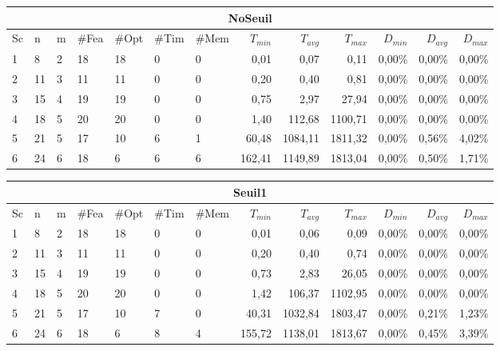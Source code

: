 \documentclass[twoside,fleqn]{EPURapport}
\begin{document}
\begin{table}[h]
    \centering
    \begin{tabular}{|l|l|l|l|l|l|l|r|r|r|r|r|r|}
    	\hline
    	\multicolumn{13}{|c|}{NoSeuil}\\ \hline
Sc &	n	&m	&\#Fea	&\#Opt	&\#Tim &\#Mem	&$T_{min}$ & $T_{avg}$	& $T_{max}$ & $D_{min}$ & $D_{avg}$	& $D_{max}$ \\ \hline
1&	8 &	2&	18&	18&	0&	0&	0,01&	0,07&	0,11	&0,00\%&	0,00\%&	0,00\%    \\ \hline
2&	11&	3&	11&	11&	0&	0&	0,20&	0,40&	0,81	&0,00\%&	0,00\%&	0,00\%     \\ \hline
3&	15&	4&	19&	19&	0&	0&	0,75&	2,97&	27,94	&0,00\%&	0,00\%&	0,00\%  \\ \hline
4 &	18	&5	&20	    &20	    &0	    & 0	        &1,40	&    112,68	&1100,71	&0,00\%&0,00\%&0,00\% \\ \hline
5 &	21	&5	&17	    &10	    &6	    & 1	        &60,48	&1084,11	&1811,32	&0,00\%&0,56\%&4,02\% \\ \hline
6 &	24	&6	&18	    &6	    &6	    & 6	        &162,41	&1149,89	&1813,04	&0,00\%&0,50\%&1,71\% \\ \hline
    \end{tabular}
    \label{tab_cut2_tab2}
\medskip \par
    \begin{tabular}{|l|l|l|l|l|l|l|r|r|r|r|r|r|}
    	\hline
    	\multicolumn{13}{|c|}{Seuil1}\\ \hline
Sc &	n	&m	&\#Fea	&\#Opt	&\#Tim &\#Mem	&$T_{min}$ & $T_{avg}$	& $T_{max}$ & $D_{min}$ & $D_{avg}$	& $D_{max}$ \\ \hline
1&	8 &	2&	18&	18&	0&	0&	0,01&	0,06&	0,09	&0,00\%&	0,00\%&	0,00\%    \\ \hline
2&	11&	3&	11&	11&	0&	0&	0,20&	0,40&	0,74	&0,00\%&	0,00\%&	0,00\%     \\ \hline
3&	15&	4&	19&	19&	0&	0&	0,73&	2,83&	26,05	&0,00\%&	0,00\%&	0,00\%  \\ \hline
4&	18&	5&	20&	20&	0&	0&	1,42	&106,37	&1102,95	&0,00\% &  0,00\%  &  0,00\%     \\ \hline
5&	21&	5&	17&	10&	7&	0&	40,31	&1032,84&	1803,47	&0,00\%	&0,21\%	&1,23\%     \\ \hline
6&	24&	6&	18&	6 &	8&	4&	155,72	&1138,01&	1813,67	&0,00\%	&0,45\%	&3,39\%     \\ \hline
    \end{tabular}
    \label{tab_cut2_s1_tab2}

\end{table}
\end{document}
